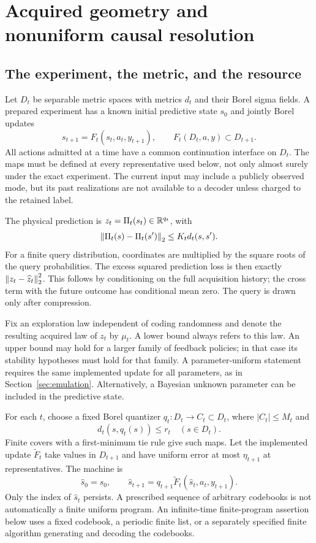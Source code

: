 \section{Acquired geometry and nonuniform causal resolution}
\label{sec:v2-resolution}
\subsection{The experiment, the metric, and the resource}
Let $D_t$ be separable metric spaces with metrics $d_t$ and their Borel
sigma fields. A prepared experiment has a known initial predictive state
$s_0$ and jointly Borel updates
\[
 s_{t+1}=F_t(s_t,a_t,y_{t+1}),\qquad
 F_t(D_t,a,y)\subset D_{t+1}.
\]
All actions admitted at a time have a common continuation interface on
$D_t$. The maps must be defined at every representative used below, not
only almost surely under the exact experiment. The current input may
include a publicly observed mode, but its past realizations are not
available to a decoder unless charged to the retained label.

The physical prediction is $z_t=\Pi_t(s_t)\in\mathbb R^{q_t}$, with
\[
 \left\lVert \Pi_t(s)-\Pi_t(s')\right\rVert_2\le K_t d_t(s,s').
\]
For a finite query distribution, coordinates are multiplied by the square
roots of the query probabilities. The excess squared prediction loss is
then exactly $\left\lVert z_t-\widehat z_t\right\rVert_2^2$. This follows by conditioning
on the full acquisition history; the cross term with the future outcome
has conditional mean zero. The query is drawn only after compression.

Fix an exploration law independent of coding randomness and denote the
resulting acquired law of $z_t$ by $\mu_t$. A lower bound always refers to
this law. An upper bound may hold for a larger family of feedback policies;
in that case its stability hypotheses must hold for that family. A
parameter-uniform statement requires the same implemented update for all
parameters, as in Section~\ref{sec:emulation}. Alternatively, a Bayesian
unknown parameter can be included in the predictive state.

For each $t$, choose a fixed Borel quantizer $q_t:D_t\to C_t\subset D_t$,
where $|C_t|\le M_t$ and
\[
 d_t(s,q_t(s))\le r_t\quad(s\in D_t).
\]
Finite covers with a first-minimum tie rule give such maps. Let the
implemented update $\widetilde F_t$ take values in $D_{t+1}$ and have
uniform error at most $\eta_{t+1}$ at representatives. The machine is
\begin{equation}\label{eq:v2-machine}
 \widehat s_0=s_0,\qquad
 \widehat s_{t+1}=q_{t+1}\widetilde F_t(\widehat s_t,a_t,y_{t+1}).
\end{equation}
Only the index of $\widehat s_t$ persists. A prescribed sequence of
arbitrary codebooks is not automatically a finite uniform program. An
infinite-time finite-program assertion below uses a fixed codebook, a
periodic finite list, or a separately specified finite algorithm generating
and decoding the codebooks.

